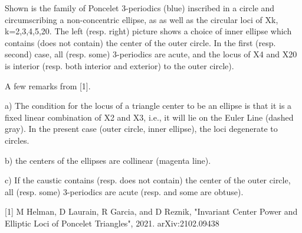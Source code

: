 Shown is the family of Poncelet 3-periodics (blue) inscribed in a circle and circumscribing a non-concentric ellipse, as as well as the circular loci of Xk, k=2,3,4,5,20. The left (resp. right) picture shows a choice of inner ellipse which contains (does not contain) the center of the outer circle. In the first (resp. second) case, all (resp. some) 3-periodics are acute, and the locus of X4 and X20 is interior (resp. both interior and exterior) to the outer circle).

A few remarks from [1].

a) The condition for the locus of a triangle center to be an ellipse is that it is a fixed linear combination of X2 and X3, i.e., it will lie on the Euler Line (dashed gray). In the present case (outer circle, inner ellipse), the loci degenerate to circles.

b) the centers of the ellipses are collinear (magenta line). 

c) If the caustic contains (resp. does not contain) the center of the outer circle, all (resp. some) 3-periodics are acute (resp. and some are obtuse).

[1] M Helman, D Laurain, R Garcia, and D Reznik, "Invariant Center Power and Elliptic Loci of Poncelet Triangles", 2021. arXiv:2102.09438